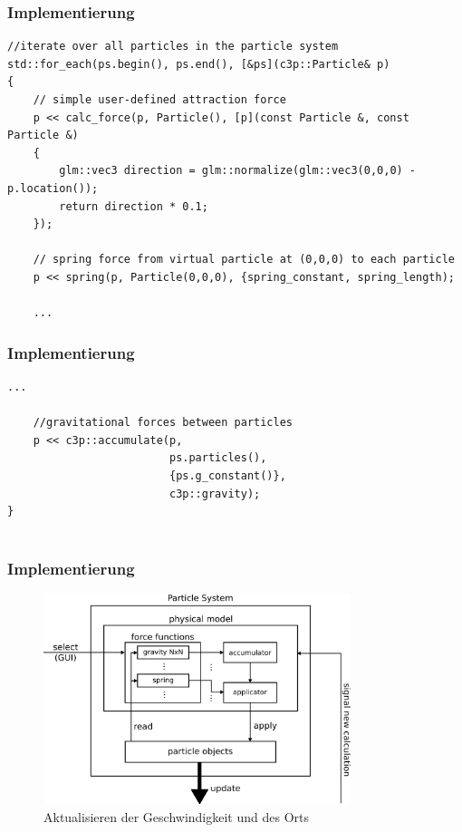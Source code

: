 \documentclass{beamer}
\begin{document}

\begin{frame}[fragile]
\frametitle{Implementierung}
\begin{lstlisting}[caption=Beispiel von Berechnung und Anwendung von Kr\"aften]
//iterate over all particles in the particle system
std::for_each(ps.begin(), ps.end(), [&ps](c3p::Particle& p)
{
	// simple user-defined attraction force
	p << calc_force(p, Particle(), [p](const Particle &, const Particle &)
	{
    	glm::vec3 direction = glm::normalize(glm::vec3(0,0,0) - p.location());
		return direction * 0.1;
    });
    
    // spring force from virtual particle at (0,0,0) to each particle
	p << spring(p, Particle(0,0,0), {spring_constant, spring_length);
   					 
	...
\end{lstlisting}
\end{frame}

\begin{frame}[fragile]
\frametitle{Implementierung}
\begin{lstlisting}[caption=Beispiel von Berechnung und Anwendung von Kr\"aften]
	...

    //gravitational forces between particles
	p << c3p::accumulate(p,
						 ps.particles(),
						 {ps.g_constant()},
    					 c3p::gravity);
}          
   
\end{lstlisting}
\end{frame}

\begin{frame}
\frametitle{Implementierung}
\begin{figure}[]
\centering
\includegraphics[width=0.8\textwidth]{images/detail3.pdf}
\caption{Aktualisieren der Geschwindigkeit und des Orts}
\end{figure}
\end{frame}
\end{document}

